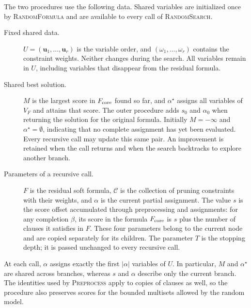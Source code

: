 \documentclass[11pt,a4paper]{article}
\theoremstyle{definition}
\theoremstyle{remark}
\begin{document}
The two procedures use the following data. Shared variables are initialized
once by \textnormal{\textsc{RandomFormula}} and are available to every call
of \textnormal{\textsc{RandomSearch}}.
\begin{description}
\item[Fixed shared data.]
$U=(\mathbf u_1,\ldots,\mathbf u_r)$ is the variable order, and
$(\omega_1,\ldots,\omega_r)$ contains the constraint weights.
Neither changes during the search. All variables remain in $U$, including
variables that disappear from the residual formula.
\item[Shared best solution.]
$M$ is the largest score in $F_{\rm core}$ found so far, and
$\alpha^\star$ assigns all variables of $V_F$ and attains that score.
The outer procedure adds $s_0$ and $\alpha_0$ when returning the solution
for the original formula. Initially
$M=-\infty$ and $\alpha^\star=\emptyset$, indicating that no complete
assignment has yet been evaluated. Every recursive call may update this
same pair. An improvement is retained when the call returns and when
the search backtracks to explore another branch.
\item[Parameters of a recursive call.]
$F$ is the residual soft formula, $\mathcal C$ is the collection of
pruning constraints with their weights, and $\alpha$ is the current
partial assignment. The value $s$ is the score offset accumulated through
preprocessing and assignments: for any completion $\beta$, its score in
the formula $F_{\rm core}$ is $s$ plus the number of clauses it satisfies in
$F$. These four parameters belong to the current node and are copied
separately for its children. The parameter $T$ is the stopping depth;
it is passed unchanged to every recursive call.
\end{description}
At each call, $\alpha$ assigns exactly the first $|\alpha|$ variables of
$U$. In particular, $M$ and $\alpha^\star$ are shared across branches,
whereas $s$ and $\alpha$ describe only the current branch.
The identities used by \textnormal{\textsc{Preprocess}} apply to copies
of clauses as well, so the procedure also preserves scores for the
bounded multisets allowed by the random model.
\end{document}
